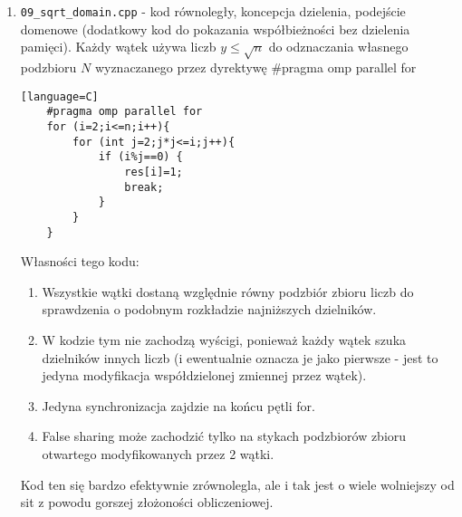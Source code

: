 \documentclass[12pt]{article}
\begin{document}
\begin {enumerate}
	\item \texttt{09\_sqrt\_domain.cpp} - kod równoległy, koncepcja dzielenia, podejście domenowe (dodatkowy kod do pokazania współbieżności bez dzielenia pamięci). Każdy wątek używa liczb \(y\le\sqrt{n}\) do odznaczania własnego podzbioru \(N\) wyznaczanego przez dyrektywę \#pragma omp parallel for
	\begin{lstlisting}[style=mystyle, caption= Sito funkcyjne z dynamic schedulingiem][language=C]
	#pragma omp parallel for
	for (i=2;i<=n;i++){
		for (int j=2;j*j<=i;j++){
			if (i%j==0) {
				res[i]=1;
				break;
			}
		}
	}
	\end{lstlisting}
	Własności tego kodu:
	\begin{enumerate}
		\item Wszystkie wątki dostaną względnie równy podzbiór zbioru liczb do sprawdzenia o podobnym rozkładzie najniższych dzielników.
		\item W kodzie tym nie zachodzą wyścigi, ponieważ każdy wątek szuka dzielników innych liczb (i ewentualnie oznacza je jako pierwsze - jest to jedyna modyfikacja współdzielonej zmiennej przez wątek).
		\item Jedyna synchronizacja zajdzie na końcu pętli for.
		\item False sharing może zachodzić tylko na stykach podzbiorów zbioru otwartego modyfikowanych przez 2 wątki.
	\end{enumerate}
	Kod ten się bardzo efektywnie zrównolegla, ale i tak jest o wiele wolniejszy od sit z powodu gorszej złożoności obliczeniowej.
\end {enumerate}
\end{document}
